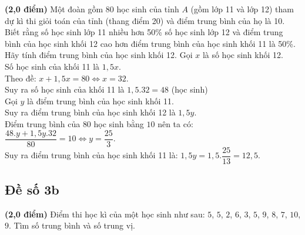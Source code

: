 \begin{bt}%
	\textbf{(2,0 điểm)}
	Một đoàn gồm $80$ học sinh của tỉnh $A$ (gồm lớp 11 và lớp 12) tham dự kì thi giỏi toán của tỉnh (thang điểm 20) và điểm trung bình của họ là 10. Biết rằng số học sinh lớp 11 nhiều hơn 50\% số học sinh lớp 12 và điểm trung bình của học sinh khối 12 cao hơn điểm trung bình của học sinh khối 11 là 50\%. Hãy tính điểm trung bình của học sinh khối 12. 
	\loigiai
	{Gọi $x$ là số học sinh khối 12. \\
		Số học sinh của khối 11 là $1,5x$. \\
		Theo đề: $x + 1,5x=80\Leftrightarrow x=32$. \\
		Suy ra số học sinh của khối 11 là $1,5.32=48$ (học sinh)\\
		Gọi $y$ là điểm trung bình của học sinh khối 11. \\
		Suy ra điểm trung bình của học sinh khối 12 là $1,5y$. \\
		Điểm trung bình của $80$ học sinh bằng $10$ nên ta có:
		$\dfrac{48. y + 1,5y. 32}{80}=10\Leftrightarrow y=\dfrac{25}{3}$.\\ 
		Suy ra điểm trung bình của học sinh khối 11 là: $1,5y=1,5.\dfrac{25}{13}=12,5$. 
	}
\end{bt}


\subsection{Đề số 3b}
\setcounter{bt}{0}
\begin{bt}%
	\textbf{(2,0 điểm)}	
	Điểm thi học kì của một học sinh như sau: $5$, $5$, $2$, $6$, $3$, $5$, $9$, $8$, $7$, $10$, $9$. Tìm số trung bình và số trung vị.
	
\end{bt}

